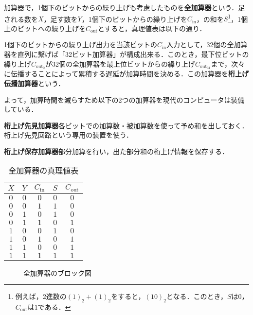 加算器で，1個下のビットからの繰り上げも考慮したものを\textbf{全加算器}という．足される数を$X$，足す数を$Y$，1個下のビットからの繰り上げを$C_{\mathrm{in}}$，の和を$S$\footnote{例えば，2進数の$(1)_{2} + (1)_{2}$をすると，$(10)_{2}$となる．このとき，$S$は$0$，$C_{\mathrm{out}}$は$1$である．}，1個上のビットへの繰り上げを$C_{\mathrm{out}}$とすると，真理値表は以下の通り．

1個下のビットからの繰り上げ出力を当該ビットの$C_{\mathrm{in}}$入力として，32個の全加算器を直列に繫げば「32ビット加算器」が構成出来る．このとき，最下位ビットの繰り上げ$C_{\mathrm{out}_0}$が32個の全加算器を最上位ビットからの繰り上げ$C_{\mathrm{out}_{31}}$まで，次々に伝播することによって累積する遅延が加算時間を決める．この加算器を\textbf{桁上げ伝播加算器}という．

よって，加算時間を減らすため以下の2つの加算器を現代のコンピュータは装備している．

\begin{enumerate}[label=\textbf{[\arabic*]}, labelsep=10pt, leftmargin=23pt]
	\item \textbf{桁上げ先見加算器}\qquad 各ビットでの加算数・被加算数を使って予め和を出しておく．桁上げ先見回路という専用の装置を使う．
	\item \textbf{桁上げ保存加算器}\qquad 部分加算を行い，出た部分和の桁上げ情報を保存する．
\end{enumerate}

\begin{table}[H]
	\caption{全加算器の真理値表}
	\label{tab:com_arch-3}
	\centering
	\begin{tabular}{c|c|c||c|c}
		\hline
		$X$ & $Y$ & $C_{\mathrm{in}}$ & $S$ & $C_{\mathrm{out}}$\\
        \hline\hline
        $0$ & $0$ & $0$ & $0$ & $0$\\
        $0$ & $0$ & $1$ & $1$ & $0$\\
        $0$ & $1$ & $0$ & $1$ & $0$\\
        $0$ & $1$ & $1$ & $0$ & $1$\\
        $1$ & $0$ & $0$ & $1$ & $0$\\
        $1$ & $0$ & $1$ & $0$ & $1$\\
        $1$ & $1$ & $0$ & $0$ & $1$\\
        $1$ & $1$ & $1$ & $1$ & $1$\\
		\hline
	\end{tabular}
\end{table}

\begin{figure}[H]
	\begin{center}
		\caption{全加算器のブロック図}
		\label{fig:com_arch-4}
	\end{center}
\end{figure}



